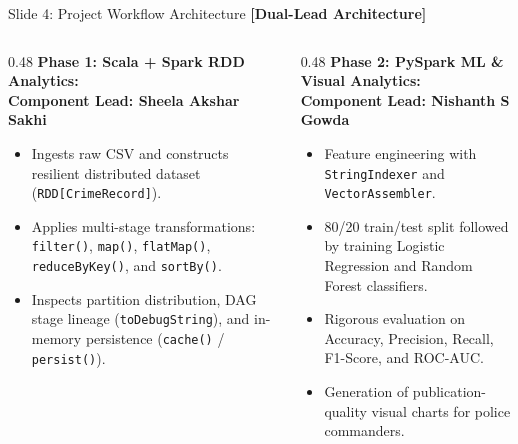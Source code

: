 \documentclass[aspectratio=169]{beamer}
\begin{document}
\begin{frame}{Slide 4: Project Workflow Architecture \hfill \footnotesize\color{AmritaMaroon}\textbf{[Dual-Lead Architecture]}}
\begin{center}
    \end{center}
    \vspace{0.25cm}
    \begin{columns}[T]
        \begin{column}{0.48\textwidth}
            \textbf{\textcolor{NavyBlue}{Phase 1: Scala + Spark RDD Analytics:}}\\
            \textcolor{AmritaMaroon}{\textbf{\scriptsize Component Lead: Sheela Akshar Sakhi}}
            \begin{itemize}\tiny
                \setlength{\itemsep}{2pt}
                \item Ingests raw CSV and constructs resilient distributed dataset (\texttt{RDD[CrimeRecord]}).
                \item Applies multi-stage transformations: \texttt{filter()}, \texttt{map()}, \texttt{flatMap()}, \texttt{reduceByKey()}, and \texttt{sortBy()}.
                \item Inspects partition distribution, DAG stage lineage (\texttt{toDebugString}), and in-memory persistence (\texttt{cache()} / \texttt{persist()}).
            \end{itemize}
        \end{column}
        \begin{column}{0.48\textwidth}
            \textbf{\textcolor{NavyBlue}{Phase 2: PySpark ML \& Visual Analytics:}}\\
            \textcolor{AmritaMaroon}{\textbf{\scriptsize Component Lead: Nishanth S Gowda}}
            \begin{itemize}\tiny
                \setlength{\itemsep}{2pt}
                \item Feature engineering with \texttt{StringIndexer} and \texttt{VectorAssembler}.
                \item 80/20 train/test split followed by training Logistic Regression and Random Forest classifiers.
                \item Rigorous evaluation on Accuracy, Precision, Recall, F1-Score, and ROC-AUC.
                \item Generation of publication-quality visual charts for police commanders.
            \end{itemize}
        \end{column}
    \end{columns}
\end{frame}
\end{document}
